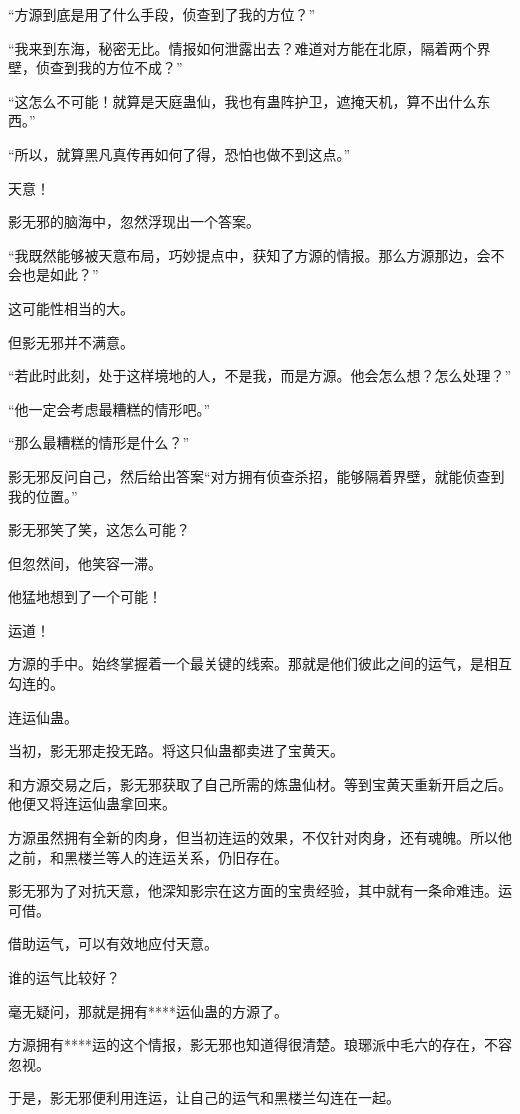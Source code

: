 \begin{this_body}
“方源到底是用了什么手段，侦查到了我的方位？”

“我来到东海，秘密无比。情报如何泄露出去？难道对方能在北原，隔着两个界壁，侦查到我的方位不成？”

“这怎么不可能！就算是天庭蛊仙，我也有蛊阵护卫，遮掩天机，算不出什么东西。”

“所以，就算黑凡真传再如何了得，恐怕也做不到这点。”

天意！

影无邪的脑海中，忽然浮现出一个答案。

“我既然能够被天意布局，巧妙提点中，获知了方源的情报。那么方源那边，会不会也是如此？”

这可能性相当的大。

但影无邪并不满意。

“若此时此刻，处于这样境地的人，不是我，而是方源。他会怎么想？怎么处理？”

“他一定会考虑最糟糕的情形吧。”

“那么最糟糕的情形是什么？”

影无邪反问自己，然后给出答案“对方拥有侦查杀招，能够隔着界壁，就能侦查到我的位置。”

影无邪笑了笑，这怎么可能？

但忽然间，他笑容一滞。

他猛地想到了一个可能！

运道！

方源的手中。始终掌握着一个最关键的线索。那就是他们彼此之间的运气，是相互勾连的。

连运仙蛊。

当初，影无邪走投无路。将这只仙蛊都卖进了宝黄天。

和方源交易之后，影无邪获取了自己所需的炼蛊仙材。等到宝黄天重新开启之后。他便又将连运仙蛊拿回来。

方源虽然拥有全新的肉身，但当初连运的效果，不仅针对肉身，还有魂魄。所以他之前，和黑楼兰等人的连运关系，仍旧存在。

影无邪为了对抗天意，他深知影宗在这方面的宝贵经验，其中就有一条命难违。运可借。

借助运气，可以有效地应付天意。

谁的运气比较好？

毫无疑问，那就是拥有****运仙蛊的方源了。

方源拥有****运的这个情报，影无邪也知道得很清楚。琅琊派中毛六的存在，不容忽视。

于是，影无邪便利用连运，让自己的运气和黑楼兰勾连在一起。


\end{this_body}
